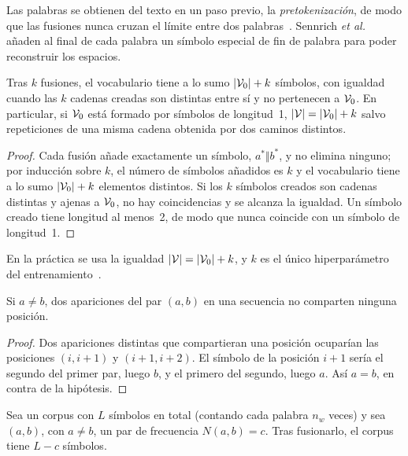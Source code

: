 Las palabras se obtienen del texto en un paso previo, la \emph{pretokenización}, de modo que las fusiones nunca cruzan el límite entre dos palabras~\cite[§3.2]{sennrich}. Sennrich \emph{et al.} añaden al final de cada palabra un símbolo especial de fin de palabra para poder reconstruir los espacios.

\begin{proposicion}\label{prop:tam-vocab}
Tras $k$ fusiones, el vocabulario tiene a lo sumo $\lvert\mathcal{V}_0\rvert+k$ símbolos, con igualdad cuando las $k$ cadenas creadas son distintas entre sí y no pertenecen a $\mathcal{V}_0$. En particular, si $\mathcal{V}_0$ está formado por símbolos de longitud~1, $\lvert\mathcal{V}\rvert=\lvert\mathcal{V}_0\rvert+k$ salvo repeticiones de una misma cadena obtenida por dos caminos distintos.
\end{proposicion}

\begin{proof}
Cada fusión añade exactamente un símbolo, $a^{*}\Vert b^{*}$, y no elimina ninguno; por inducción sobre $k$, el número de símbolos añadidos es $k$ y el vocabulario tiene a lo sumo $\lvert\mathcal{V}_0\rvert+k$ elementos distintos. Si los $k$ símbolos creados son cadenas distintas y ajenas a $\mathcal{V}_0$, no hay coincidencias y se alcanza la igualdad. Un símbolo creado tiene longitud al menos~2, de modo que nunca coincide con un símbolo de longitud~1.
\end{proof}

En la práctica se usa la igualdad $\lvert\mathcal{V}\rvert=\lvert\mathcal{V}_0\rvert+k$, y $k$ es el único hiperparámetro del entrenamiento~\cite[§3.2]{sennrich}.

\begin{lema}\label{lem:solape}
Si $a\neq b$, dos apariciones del par $(a,b)$ en una secuencia no comparten ninguna posición.
\end{lema}

\begin{proof}
Dos apariciones distintas que compartieran una posición ocuparían las posiciones $(i,i+1)$ y $(i+1,i+2)$. El símbolo de la posición $i+1$ sería el segundo del primer par, luego $b$, y el primero del segundo, luego $a$. Así $a=b$, en contra de la hipótesis.
\end{proof}

\begin{proposicion}\label{prop:compresion}
Sea un corpus con $L$ símbolos en total (contando cada palabra $n_w$ veces) y sea $(a,b)$, con $a\neq b$, un par de frecuencia $N(a,b)=c$. Tras fusionarlo, el corpus tiene $L-c$ símbolos.
\end{proposicion}

